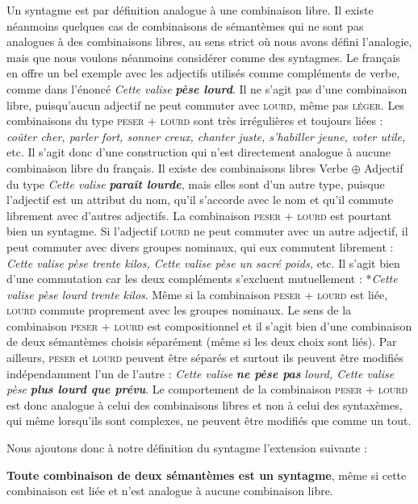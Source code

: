 Un syntagme est par définition analogue à une combinaison libre. Il existe néanmoins quelques cas de combinaisons de sémantèmes qui ne sont pas analogues à des combinaisons libres, au sens strict où nous avons défini l’analogie, mais que nous voulons néanmoins considérer comme des syntagmes. Le français en offre un bel exemple avec les adjectifs utilisés comme compléments de verbe, comme dans l’énoncé \textit{Cette valise} \textbf{\textit{pèse lourd}}. Il ne s’agit pas d’une combinaison libre, puisqu’aucun adjectif ne peut commuter avec \textsc{lourd}, même pas \textsc{léger}. Les combinaisons du type \textsc{peser} + \textsc{lourd} sont très irrégulières et toujours liées : \textit{coûter cher, parler fort, sonner creux, chanter juste, s’habiller jeune, voter utile,} etc. Il s’agit donc d’une construction qui n’est directement analogue à aucune combinaison libre du français. Il existe des combinaisons libres Verbe ${\oplus}$ Adjectif du type \textit{Cette valise} \textbf{\textit{paraît lourde}}, mais elles sont d’un autre type, puisque l’adjectif est un attribut du nom, qu’il s’accorde avec le nom et qu’il commute librement avec d’autres adjectifs. La combinaison \textsc{peser} + \textsc{lourd} est pourtant bien un syntagme. Si l’adjectif \textsc{lourd} ne peut commuter avec un autre adjectif, il peut commuter avec divers groupes nominaux, qui eux commutent librement : \textit{Cette valise pèse trente kilos, Cette valise pèse un sacré poids,} etc. Il s’agit bien d’une commutation car les deux compléments s’excluent mutuellement : *\textit{Cette valise pèse lourd trente kilos}. Même si la combinaison \textsc{peser} + \textsc{lourd} est liée, \textsc{lourd} commute proprement avec les groupes nominaux. Le sens de la combinaison \textsc{peser} + \textsc{lourd} est compositionnel et il s’agit bien d’une combinaison de deux sémantèmes choisis séparément (même si les deux choix sont liés). Par ailleurs, \textsc{peser} et \textsc{lourd} peuvent être séparés et surtout ils peuvent être modifiés indépendamment l’un de l’autre : \textit{Cette valise} \textbf{\textit{ne pèse pas}} \textit{lourd, Cette valise pèse} \textbf{\textit{plus lourd que prévu}}. Le comportement de la combinaison \textsc{peser} + \textsc{lourd} est donc analogue à celui des combinaisons libres et non à celui des syntaxèmes, qui même lorsqu’ils sont complexes, ne peuvent être modifiés que comme un tout.

Nous ajoutons donc à notre définition du syntagme l’extension suivante :

{\textbf{Toute combinaison de deux sémantèmes est un syntagme}, même si cette combinaison est liée et n’est analogue à aucune combinaison libre.}

